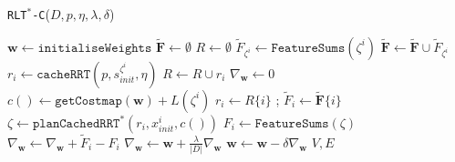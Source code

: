 \documentclass{article}  %
\begin{document}
	\begin{algorithm}
	\caption{\texttt{RLT$^*$-C}($D,p,\eta,\lambda,\delta$)\label{alg:ammp}}
	\begin{algorithmic}[1]
	\STATE $\mathbf{w} \gets \texttt{initialiseWeights}$
	\STATE $\mathbf{\tilde{F}} \gets \emptyset$
	\STATE $R \gets \emptyset$
	\STATE $\tilde{F}_{\zeta^i} \gets \texttt{FeatureSums}(\zeta^i)$
	\STATE $\mathbf{\tilde{F}} \gets \mathbf{\tilde{F}} \cup \tilde{F}_{\zeta^i}$
	\STATE $r_i \gets \texttt{cacheRRT}(p,s_{init}^{\zeta^i},\eta)$
	\STATE $R \gets R \cup r_i $
	\ENDFOR
	\REPEAT
	\STATE $\nabla_{\mathbf{w}}\gets 0$
	\STATE $c() \gets \texttt{getCostmap}(\mathbf{w}) + L(\zeta^i)$ 
	\STATE $r_i \gets R\{i\}$ ;	$\tilde{F}_i \gets \mathbf{\tilde{F}}\{i\}$ 
	\STATE $\zeta \gets \texttt{planCachedRRT}^*(r_i,x^i_{init},c())$
	\STATE $F_i \gets \texttt{FeatureSums}(\zeta)$
	\STATE $\nabla_{\mathbf{w}} \gets \nabla_{\mathbf{w}} + \tilde{F}_i - F_i $
	\ENDFOR
	\STATE $\nabla_{\mathbf{w}} \gets \mathbf{w} + \frac{\lambda}{|D|}\nabla_{\mathbf{w}} $
	\STATE $\mathbf{w} \gets \mathbf{w} - \delta\nabla_{\mathbf{w}} $
	\RETURN $V,E$

	\end{algorithmic}
	\end{algorithm}


\end{document}
